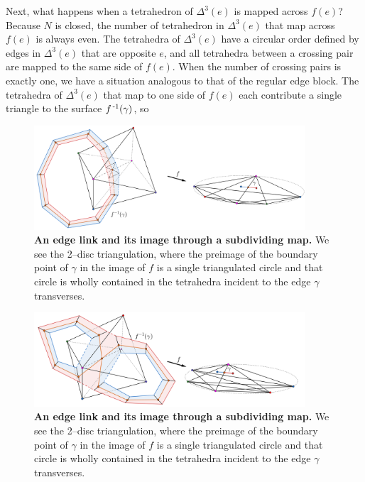 Next, what happens when a tetrahedron of $\Delta^3(e)$ is mapped across $f(e)$?
Because $N$ is closed, the number of tetrahedron in $\Delta^3(e)$ that map across $f(e)$ is always even.
The tetrahedra of $\Delta^3(e)$ have a circular order defined by edges in $\Delta^3(e)$ that are opposite $e$, and all tetrahedra between a crossing pair are mapped to the same side of $f(e)$.
When the number of crossing pairs is exactly one, we have a situation analogous to that of the regular edge block.
The tetrahedra of $\Delta^3(e)$ that map to one side of $f(e)$ each contribute a single triangle to the surface $f^{\,\text{-}1}(\gamma)$, so 

\begin{figure}[h!]
	\centering
	\includegraphics[width=0.9\textwidth]{figures/pl-regular-surface.png}
	\caption{
		\textbf{An edge link and its image through a subdividing map.}
		We see the 2--disc triangulation, where the preimage of the boundary point of $\gamma$ in the image of $f$ is a single triangulated circle and that circle is wholly contained in the tetrahedra incident to the edge $\gamma$ transverses.
	}
	\label{fig:pl-regular-surface}
\end{figure}

\begin{figure}[h!]
	\centering
	\includegraphics[width=0.9\textwidth]{figures/pl-indefinite-fold.png}
	\caption{
		\textbf{An edge link and its image through a subdividing map.}
		We see the 2--disc triangulation, where the preimage of the boundary point of $\gamma$ in the image of $f$ is a single triangulated circle and that circle is wholly contained in the tetrahedra incident to the edge $\gamma$ transverses.
	}
	\label{fig:pl-indefinite-fold}
\end{figure}


